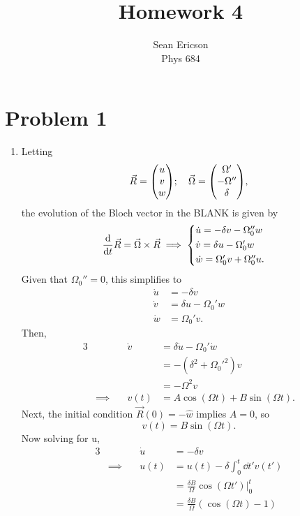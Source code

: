 \documentclass[12pt]{article}
\begin{document}
	
\title{Homework 4}
\author{Sean Ericson \\ Phys 684}
\maketitle

\section*{Problem 1}
\begin{enumerate}[label=(\alph*)]
    \item Letting
    \[ \vec{R} = \mqty(u\\v\\w); \quad \vec{\Omega} = \mqty(\Omega'\\-\Omega''\\\delta), \] 
    the evolution of the Bloch vector in the BLANK is given by
    \[
        \dv{t}\vec{R} = \vec{\Omega}\times\vec{R} \implies
        \begin{cases*}
            \dot{u} = -\delta v - \Omega_0'' w & \\
            \dot{v} = \delta u -\Omega_0' w & \\
            \dot{w} = \Omega_0' v + \Omega_0'' u. & \\
        \end{cases*} 
    \]
    Given that $\Omega_0'' = 0$, this simplifies to
    \begin{align*}
        \dot{u} &= -\delta v \\
        \dot{v} &= \delta u -\Omega_0' w \\
        \dot{w} &= \Omega_0' v.
    \end{align*}
    Then,
    \begin{alignat*}{3}
        &\quad & \ddot{v} &= \delta\dot{u} -\Omega_0'\dot{w} \\
        &\quad & &= -\left(\delta^2 + \Omega_0'^2\right)v \\
        &\quad & &= -\Omega^2v \\
        &\implies\quad & v(t) &= A\cos(\Omega t) + B\sin(\Omega t).
    \end{alignat*}
    Next, the initial condition $\vec{R}(0) = -\hat{w}$ implies $A = 0$, so
    \[ v(t) = B\sin(\Omega t). \]
    Now solving for u,
    \begin{alignat*}{3}
        &\quad & \dot{u} &= -\delta v \\
        &\implies\quad & u(t) &= u(t) - \delta\int_0^t\dd t' v(t') \\
        &\quad & &= \frac{\delta B}{\Omega}\cos(\Omega t')\big\vert_0^t \\
        &\quad & &= \frac{\delta B}{\Omega}\left(\cos(\Omega t) - 1\right)
    \end{alignat*}
\end{enumerate}
\end{document}
